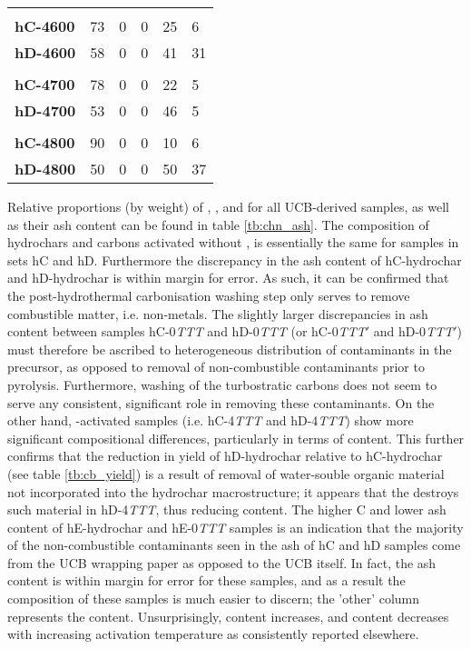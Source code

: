 \begin{table}[ht!]
\begin{tabularx}{\textwidth}{lXXXX|X}
        &&&&&\\
        \textbf{hC-4600} & 73 & 0 & 0 & 25 & 6 \\
        \textbf{hD-4600} & 58 & 0 & 0 & 41 & 31 \\
        &&&&&\\
        \textbf{hC-4700} & 78 & 0 & 0 & 22 & 5 \\
        \textbf{hD-4700} & 53 & 0 & 0 & 46 & 5 \\
        &&&&&\\
        \textbf{hC-4800} & 90 & 0 & 0 & 10 & 6 \\
        \textbf{hD-4800} & 50 & 0 & 0 & 50 & 37 \\
    \bottomrule
    \end{tabularx}
\end{table}

Relative proportions (by weight) of , , and  for all UCB-derived samples, as well as their ash content can be found in table \ref{tb:chn_ash}. The composition of hydrochars and carbons activated without , is essentially the same for samples in sets hC and hD. Furthermore the discrepancy in the ash content of hC-hydrochar and hD-hydrochar is within margin for error. As such, it can be confirmed that the post-hydrothermal carbonisation washing step only serves to remove combustible matter, i.e. non-metals. The slightly larger discrepancies in ash content between samples hC-0\textit{TTT} and hD-0\textit{TTT} (or hC-0\textit{TTT}$'$ and hD-0\textit{TTT}$'$) must therefore be ascribed to heterogeneous distribution of contaminants in the precursor, as opposed to removal of non-combustible contaminants prior to pyrolysis. Furthermore, washing of the turbostratic carbons does not seem to serve any consistent, significant role  in removing these contaminants. On the other hand, -activated samples (i.e. hC-4\textit{TTT} and hD-4\textit{TTT}) show more significant compositional differences, particularly in terms of  content. This further confirms that the reduction in yield of hD-hydrochar relative to hC-hydrochar (see table \ref{tb:cb_yield}) is a result of removal of water-souble organic material not incorporated into the hydrochar macrostructure; it appears that the  destroys such material in hD-4\textit{TTT}, thus reducing  content. The higher C and lower ash content of hE-hydrochar and hE-0\textit{TTT} samples is an indication that the majority of the non-combustible contaminants seen in the ash of hC and hD samples come from the UCB wrapping paper as opposed to the UCB itself. In fact, the ash content is within margin for error for these samples, and as a result the composition of these samples is much easier to discern; the 'other' column represents the  content. Unsurprisingly,  content increases, and  content decreases with increasing activation temperature as consistently reported elsewhere.\citep{Blankenship2022Modulating, Sevilla2014Energy}

